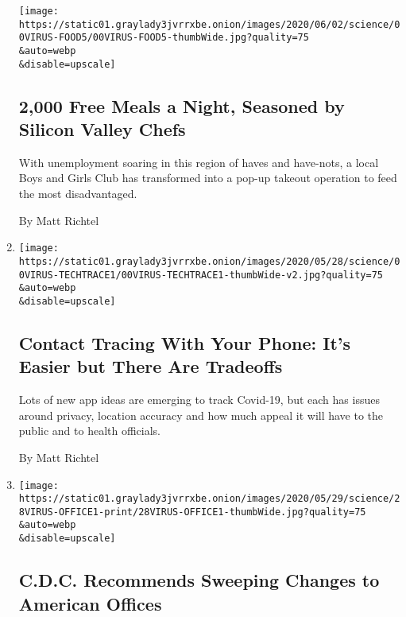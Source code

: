 \begin{enumerate}
  \texttt{[image: https://static01.graylady3jvrrxbe.onion/images/2020/06/02/science/00VIRUS-FOOD5/00VIRUS-FOOD5-thumbWide.jpg?quality=75\\\&auto=webp\\\&disable=upscale]}

  \hypertarget{2000-free-meals-a-night-seasoned-by-silicon-valley-chefs}{%
  \subsection{2,000 Free Meals a Night, Seasoned by Silicon Valley
  Chefs}\label{2000-free-meals-a-night-seasoned-by-silicon-valley-chefs}}

  With unemployment soaring in this region of haves and have-nots, a
  local Boys and Girls Club has transformed into a pop-up takeout
  operation to feed the most disadvantaged.

  By Matt Richtel
\item
  \href{/2020/06/03/health/coronavirus-contact-tracing-apps.html}{}

  \texttt{[image: https://static01.graylady3jvrrxbe.onion/images/2020/05/28/science/00VIRUS-TECHTRACE1/00VIRUS-TECHTRACE1-thumbWide-v2.jpg?quality=75\\\&auto=webp\\\&disable=upscale]}

  \hypertarget{contact-tracing-with-your-phone-its-easier-but-there-are-tradeoffs}{%
  \subsection{Contact Tracing With Your Phone: It's Easier but There Are
  Tradeoffs}\label{contact-tracing-with-your-phone-its-easier-but-there-are-tradeoffs}}

  Lots of new app ideas are emerging to track Covid-19, but each has
  issues around privacy, location accuracy and how much appeal it will
  have to the public and to health officials.

  By Matt Richtel
\item
  \href{/2020/05/28/health/cdc-coronavirus-offices.html}{}

  \texttt{[image: https://static01.graylady3jvrrxbe.onion/images/2020/05/29/science/28VIRUS-OFFICE1-print/28VIRUS-OFFICE1-thumbWide.jpg?quality=75\\\&auto=webp\\\&disable=upscale]}

  \hypertarget{cdc-recommends-sweeping-changes-to-american-offices}{%
  \subsection{C.D.C. Recommends Sweeping Changes to American
  Offices}\label{cdc-recommends-sweeping-changes-to-american-offices}}


\end{enumerate}
